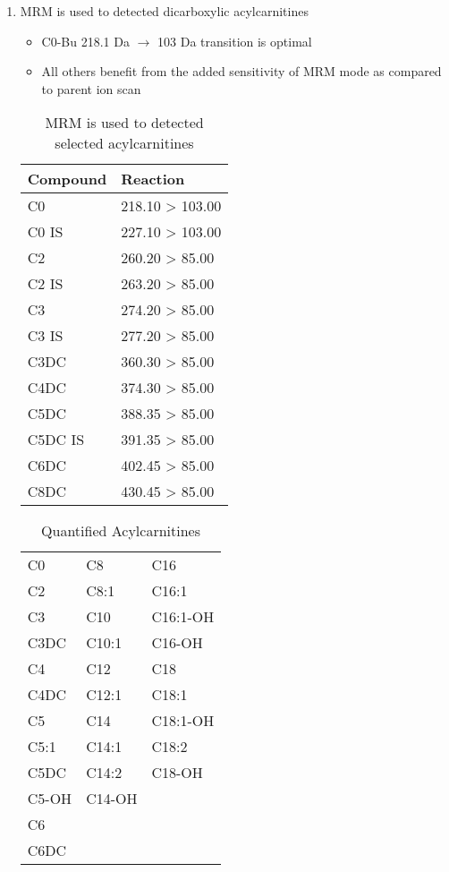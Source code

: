 \documentclass{scrartcl}
\begin{document}
\begin{enumerate}
\begin{LaTeX}
\begin{center}
\end{center}
\end{LaTeX}

\item MRM is used to detected dicarboxylic acylcarnitines
\label{sec:orgb374980}

\begin{itemize}
\item C0-Bu 218.1 Da \(\to\) 103 Da transition is optimal
\item All others benefit from the added sensitivity of MRM mode as compared to parent ion scan
\end{itemize}

\begin{table}[htbp]
\caption{\label{tab:org09c0a8f}
MRM is used to detected selected acylcarnitines}
\centering
\begin{tabular}{ll}
Compound & Reaction\\
\hline
C0 & 218.10 > 103.00\\
C0 IS & 227.10 > 103.00\\
C2 & 260.20 > 85.00\\
C2 IS & 263.20 > 85.00\\
C3 & 274.20 > 85.00\\
C3 IS & 277.20 > 85.00\\
C3DC & 360.30 > 85.00\\
C4DC & 374.30 > 85.00\\
C5DC & 388.35 > 85.00\\
C5DC IS & 391.35 > 85.00\\
C6DC & 402.45 > 85.00\\
C8DC & 430.45 > 85.00\\
\end{tabular}
\end{table}

\begin{table}[htbp]
\caption{\label{tab:orgde6b093}
Quantified Acylcarnitines}
\centering
\begin{tabular}{lll}
C0 & C8 & C16\\
C2 & C8:1 & C16:1\\
C3 & C10 & C16:1-OH\\
C3DC & C10:1 & C16-OH\\
C4 & C12 & C18\\
C4DC & C12:1 & C18:1\\
C5 & C14 & C18:1-OH\\
C5:1 & C14:1 & C18:2\\
C5DC & C14:2 & C18-OH\\
C5-OH & C14-OH & \\
C6 &  & \\
C6DC &  & \\
\end{tabular}
\end{table}


\end{enumerate}
\end{document}
